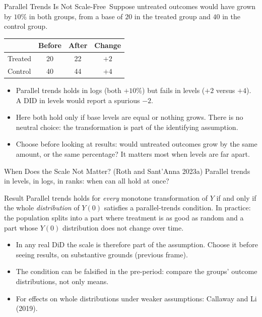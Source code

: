 \documentclass[aspectratio=169,11pt,xcolor=dvipsnames]{beamer}
\newcommand{\srcp}[1]{{\scriptsize\color{gray}(#1)}}
\newcommand{\srct}[1]{#1}
\newcommand{\core}{\,\raisebox{0.6pt}{\textcolor{corestar}{$\bigstar$}}}
\begin{document}
\begin{frame}{Parallel Trends Is Not Scale-Free\core}
Suppose untreated outcomes would have grown by $10\%$ in both groups, from a base
of $20$ in the treated group and $40$ in the control group.
\vskip3pt
\begin{center}\small
\renewcommand{\arraystretch}{1.2}
\begin{tabular}{lccc}
\toprule
 & Before & After & Change \\
\midrule
Treated & 20 & 22 & $+2$ \\
Control & 40 & 44 & $+4$ \\
\bottomrule
\end{tabular}
\end{center}
\vskip4pt
\begin{itemize}\itemsep3pt
  \item Parallel trends holds \alert{in logs} (both $+10\%$) but \alert{fails in
        levels} ($+2$ versus $+4$). A DID in levels would report a spurious
        $-2$.
  \item Here both hold only if base levels are equal or nothing grows.
        \alert{There is no neutral choice}: the transformation is part of the
        identifying assumption.
  \item Choose before looking at results: would untreated outcomes grow by the same
        amount, or the same percentage? It matters most when levels are far apart.
\end{itemize}
\end{frame}

\begin{frame}{When Does the Scale Not Matter? \srcp{Roth and Sant'Anna 2023a}}
Parallel trends in levels, in logs, in ranks: when can all hold at once?
\vskip3pt
\begin{block}{Result}
Parallel trends holds for \emph{every} monotone transformation of $Y$ if and only if
the whole \emph{distribution} of $Y(0)$ satisfies a parallel-trends condition.
In practice: the population splits into a part where treatment is as good as
random and a part whose $Y(0)$ distribution does not change over time.
\end{block}
\vskip4pt
\begin{itemize}\itemsep3pt
  \item In any real DiD the scale is therefore part of the assumption. Choose it
        before seeing results, on substantive grounds (previous frame).
  \item The condition can be falsified in the pre-period: compare the groups'
        outcome distributions, not only means.
  \item For effects on whole distributions under weaker assumptions:
        \srct{Callaway and Li (2019)}.
\end{itemize}
\end{frame}
\end{document}
